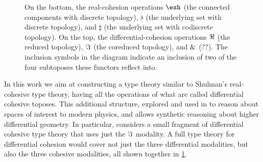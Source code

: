 \documentclass{article}
\begin{document}
\begin{figure}
\begin{center}
\end{center}
\caption{On the bottom, the real-cohesion operations $\shape$ (the connected
  components with discrete topology), $\flat$ (the underlying set with discrete topology), and $\sharp$ (the underlying set with
  codiscrete topology). On the top, the differential-cohesion operations $\Re$
  (the reduced topology), $\Im$ (the coreduced topology), and $\&$ (??).
   The inclusion symbols in the diagram indicate an
  inclusion of two of the four subtoposes these functors reflect into. }
\label{fig:modalities}
\end{figure}

In this work we aim at constructing a type theory similar to Shulman's real-cohesive type theory,
having all the operations of what are called differential cohesive toposes.
This additional structure, explored and used in \citet{Schreiber2013} 
to reason about spaces of interest to modern physics, 
 and allows synthetic reasoning about 
higher differential geometry. 
In particular, \citeauthor{Wellen2017}
considers a small fragment of differential cohesive type theory that uses just
the $\Im$ modality. A full type theory for differential cohesion would cover
not just the three differential modalities, but also the three cohesive
modalities, all shown together in \cref{fig:modalities}.
\end{document}
